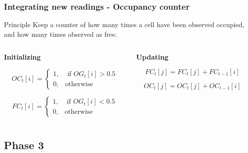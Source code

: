 \documentclass{beamer}
\begin{document}
	\begin{frame}
		\frametitle{Integrating new readings - Occupancy counter}		
		\begin{block}{Principle}
			Keep a counter of how many times a cell have been observed occupied, and how many times observed as free.
		\end{block}		
		
		  \begin{columns}[t]
		  \begin{column}{5cm}
		  \textbf{Initializing}
		  
		    \begin{equation}
			OC_t[i] =  \begin{cases} 1, & \mbox{ if $OG_t[i] > 0.5$} \\
			                       0, & \mbox{otherwise} \end{cases}
			\end{equation}

			\begin{equation}
			FC_t[i] = \begin{cases} 1, & \mbox{ if $OG_t[i] < 0.5$} \\
			                       0, & \mbox{otherwise} \end{cases}
			\end{equation}		  
		  
		  \end{column}
		  
		  \begin{column}{5cm}
		  \textbf{Updating}

			\begin{equation}
			FC_t[j] = FC_t[j] + FC_{t-1}[i]
			\end{equation}
			
			\begin{equation}
			OC_t[j] = OC_t[j] + OC_{t-1}[i]
			\end{equation}		  
		  
		  \end{column}
		 \end{columns}		 		
		
	\end{frame}

\subsection{Phase 3}
\end{document}
